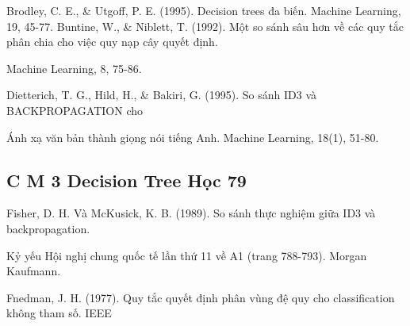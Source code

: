 Brodley, C. E., \& Utgoff, P. E. (1995). Decision trees đa biến. Machine Learning, 19, 45-77. Buntine, W., \& Niblett, T. (1992). Một so sánh sâu hơn về các quy tắc phân chia cho việc quy nạp cây quyết định.

Machine Learning, 8, 75-86.

Dietterich, T. G., Hild, H., \& Bakiri, G. (1995). So sánh ID3 và BACKPROPAGATION cho

Ánh xạ văn bản thành giọng nói tiếng Anh. Machine Learning, 18(1), 51-80.

\subsection{C M 3 Decision Tree Học 79}

Fisher, D. H. Và McKusick, K. B. (1989). So sánh thực nghiệm giữa ID3 và backpropagation.

Kỷ yếu Hội nghị chung quốc tế lần thứ 11 về A1 (trang 788-793). Morgan Kaufmann.

Fnedman, J. H. (1977). Quy tắc quyết định phân vùng đệ quy cho classification không tham số. IEEE

